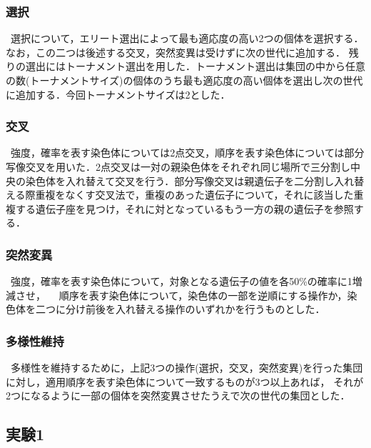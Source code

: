 \documentclass[twocolumn]{jarticle}     %
\begin{document}
\subsubsection{選択}
\ 選択について，エリート選出によって最も適応度の高い2つの個体を選択する．なお，この二つは後述する交叉，突然変異は受けずに次の世代に追加する．
残りの選出にはトーナメント選出を用した．トーナメント選出は集団の中から任意の数(トーナメントサイズ)の個体のうち最も適応度の高い個体を選出し次の世代に追加する．今回トーナメントサイズは2とした．
　
\subsubsection{交叉}
\ 強度，確率を表す染色体については2点交叉，順序を表す染色体については部分写像交叉を用いた．2点交叉は一対の親染色体をそれぞれ同じ場所で三分割し中央の染色体を入れ替えて交叉を行う．部分写像交叉は親遺伝子を二分割し入れ替える際重複をなくす交叉法で，重複のあった遺伝子について，それに該当した重複する遺伝子座を見つけ，それに対となっているもう一方の親の遺伝子を参照する．
　
\subsubsection{突然変異}
\ 強度，確率を表す染色体について，対象となる遺伝子の値を各50\%の確率に1増減させ，
　順序を表す染色体について，染色体の一部を逆順にする操作か，染色体を二つに分け前後を入れ替える操作のいずれかを行うものとした．
　
\subsubsection{多様性維持}
\ 多様性を維持するために，上記3つの操作(選択，交叉，突然変異)を行った集団に対し，適用順序を表す染色体について一致するものが3つ以上あれば，
それが2つになるように一部の個体を突然変異させたうえで次の世代の集団とした．
　
\subsection{実験1}　
\end{document}
